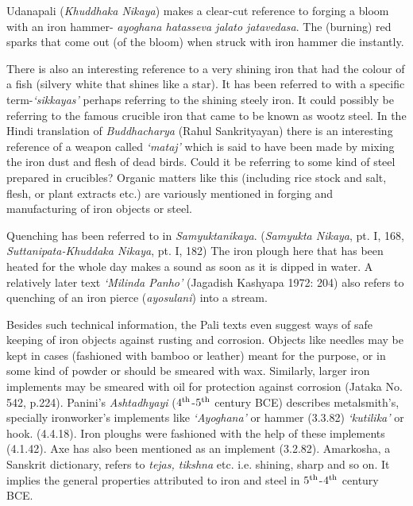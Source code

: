 Udanapali ({\it Khuddhaka Nikaya}) makes a clear-cut reference to forging a bloom with an iron hammer- {\it ayoghana hatasseva jalato jatavedasa}. The (burning) red sparks that come out (of the bloom) when struck with iron hammer die instantly.

There is also an interesting reference to a very shining iron that had the colour of a fish (silvery white that shines like a star). It has been referred to with a specific term-{\it ‘sikkayas’} perhaps referring to the shining steely iron. It could possibly be referring to the famous crucible iron that came to be known as wootz steel. In the Hindi translation of {\it Buddhacharya} (Rahul Sankrityayan) there is an interesting reference of a weapon called {\it ‘mataj’} which is said to have been made by mixing the iron dust and flesh of dead birds. Could it be referring to some kind of steel prepared in crucibles? Organic matters like this (including rice stock and salt, flesh, or plant extracts etc.) are variously mentioned in forging and manufacturing of iron objects or steel. 

Quenching has been referred to in {\it Samyuktanikaya}. ({\it Samyukta Nikaya}, pt. I, 168, {\it Suttanipata-Khuddaka Nikaya}, pt. I, 182) The iron plough here that has been heated for the whole day makes a sound as soon as it is dipped in water. A relatively later text {\it ‘Milinda Panho’} (Jagadish Kashyapa 1972: 204) also refers to quenching of an iron pierce ({\it ayosulani}) into a stream.

Besides such technical information, the Pali texts even suggest ways of safe keeping of iron objects against rusting and corrosion. Objects like needles may be kept in cases (fashioned with bamboo or leather) meant for the purpose, or in some kind of powder or should be smeared with wax. Similarly, larger iron implements may be smeared with oil for protection against corrosion (Jataka No. 542, p.224). Panini’s {\it Ashtadhyayi} ($4^{\rm th}$-$5^{\rm th}$ century BCE) describes metalsmith’s, specially ironworker’s implements like {\it ‘Ayoghana’} or hammer (3.3.82) {\it ‘kutilika’} or hook. (4.4.18). Iron ploughs were fashioned with the help of these implements (4.1.42). Axe has also been mentioned as an implement (3.2.82). Amarkosha, a Sanskrit dictionary, refers to {\it tejas, tikshna} etc. i.e. shining, sharp and so on. It implies the general properties attributed to iron and steel in $5^{\rm th}$-$4^{\rm th}$ century BCE.

